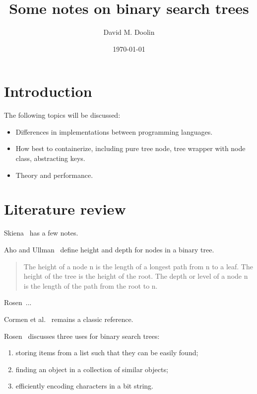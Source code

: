 \documentclass{article}
\title{Some notes on binary search trees}
\date{\today}
\author{David M. Doolin}
\begin{document}
\maketitle


\tableofcontents

\section{Introduction}


The following topics will be discussed:

\begin{itemize}

\item Differences in implementations between programming languages.
\item How best to containerize, including pure tree node, tree wrapper with
node class, abstracting keys.
\item Theory and performance.

\end{itemize}


\section{Literature review}

Skiena~\cite[pp. 77, 370, 375, 589]{skiena} has a few notes.

Aho and Ullman~\cite[pp. 210]{aho:av:1992} define height and depth for nodes in a binary tree.

\begin{quote}
The height of a node n is the length of a longest path from n to
a leaf. The height of the tree is the height of the root. The depth or level of
a node n is the length of the path from the root to n.
\end{quote}

Rosen~\cite{rosen}...

Cormen et al.~\cite{cormen:th:1990} remains a classic reference.

Rosen~\cite[pp. 757-760]{rosen} discusses three uses for binary search trees:

\begin{enumerate}
\item storing items from a list such that they can be easily found;
\item finding an object in a collection of similar objects;
\item efficiently encoding characters in a bit string.
\end{enumerate}
\end{document}
